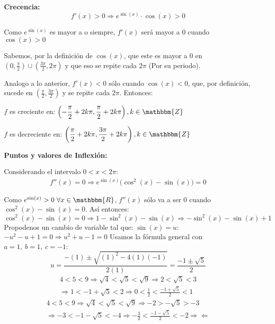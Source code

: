\documentclass[12pt]{article}
\begin{document}
\begin{enumerate}[\hspace{9px} a)]
        \textbf{Crecencia: }
            \begin{equation*}
                f'(x)>0 \Rightarrow e^{\sin(x)}\cdot\cos(x)>0
            \end{equation*}

            Como \(e^{\sin(x)}\) es mayor a o siempre, \(f'(x)\) ser\'a mayor a 0 cuando \(\cos(x)>0\)\medskip

            Sabemos, por la definici\'on de \(\cos(x)\), que este es mayor a 0 en \(\left(0,\displaystyle\frac{\pi}{2}\right)\cup\left(\frac{3\pi}{2},2\pi\right)\) y que eso se repite cada \(2\pi\) (Por su periodo).\medskip

            Analogo a lo anterior, \(f'(x)<0\) s\'olo cuando \(\cos(x)<0\), que, por definici\'on, sucede en \(\left(\displaystyle\frac{\pi}{2},\frac{3\pi}{2}\right)\) y se repite cada \(2\pi\). Entonces:\medskip

            $f$ es creciente en: \quad \(\left(-\displaystyle\frac{\pi}{2}+2k\pi,\frac{\pi}{2}+2k\pi\right), k\in\mathbbm{Z}\)\medskip

            $f$ es decreciente en: \quad \(\left(\displaystyle\frac{\pi}{2}+2k\pi,\frac{3\pi}{2}+2k\pi\right), k\in\mathbbm{Z}\)\medskip

        \textbf{Puntos y valores de Inflexi\'on: }\medskip

            Considerando el intervalo \(0<x<2\pi\):
            \begin{align*}
                f''(x)=0 \Longrightarrow e^{\sin(x)}\big(\cos^2(x)-\sin(x)\big)=0
            \end{align*}

            Como \(e^{\sin(x)}>0 \ \forall x\in\mathbbm{R}\), \(f''(x)\) s\'olo va a ser 0 cuando \(\cos^2(x)-\sin(x)=0\). As\'i entonces:
            \begin{equation*}
                \cos^2(x)-\sin(x)=0 \Longrightarrow 1-\sin^2(x)-\sin(x) \Longrightarrow -\sin^2(x)-\sin(x)+1
            \end{equation*}
            Propodenos un cambio de variable tal que: \(\sin(x)=u\): \quad \(-u^2-u+1=0 \Longrightarrow u^2+u-1=0\)\medskip
            Usamos la f\'ormula general con \(a=1, \ b=1, \ c=-1\):
            \begin{equation*}
                u = \frac{-(1)\pm\sqrt{(1)^2-4(1)(-1)}}{2(1)} = \frac{-1\pm\sqrt{5}}{2} 
            \end{equation*}
            \begin{multline*}
                4<5<9 \Longrightarrow \sqrt{4}<\sqrt{5}<\sqrt{9} \Longrightarrow 2<\sqrt{5}<3 \\ \Longrightarrow 1<-1+\sqrt{5}<2 \Longrightarrow 0<\frac{1}{2}<\frac{-1+\sqrt{5}}{2}<1
            \end{multline*}
            \begin{multline*}
                4<5<9 \Longrightarrow \sqrt{4}<\sqrt{5}<\sqrt{9} \Longrightarrow -2>-\sqrt{5}>-3 \\ \Longrightarrow -3<-1-\sqrt{5}<-4 \Longrightarrow -\frac{3}{2}<\frac{-1-\sqrt{5}}{2}<-2 \Rightarrow\!\Leftarrow
            \end{multline*}


\end{enumerate}
\end{document}
